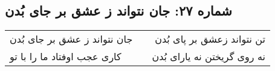 \begin{center}
\section*{شماره ۲۷: جان نتواند ز عشق بر جای بُدن}
\label{sec:027}
\begin{longtable}{l p{0.5cm} r}
جان نتواند ز عشق بر جای بُدن
&&
تن نتواند زعشق بر پای بُدن
\\
کاری عجب اوفتاد ما را با تو
&&
نه روی گریختن نه یارای بُدن
\\
\end{longtable}
\end{center}
